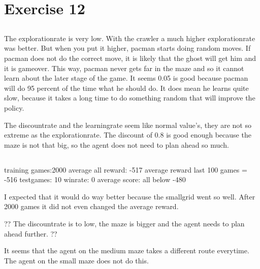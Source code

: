 \section{Exercise 12}
\subsection{}
The explorationrate is very low. With the crawler a much higher 
explorationrate was better. But when you put it higher, pacman starts 
doing random moves. If pacman does not do the correct move, it is 
likely that the ghost will get him and it is gameover. This way, pacman
never gets far in the maze and so it cannot learn about the later stage
of the game. It seems 0.05 is good because pacman will do 95 percent 
of the time what he should do. It does mean he learns quite slow, because
it takes a long time to do something random that will improve the policy.

The discountrate and the learningrate seem like normal value's, they 
are not so extreme as the explorationrate. The discount of 0.8 is good 
enough because the maze is not that big, so the agent does not need to 
plan ahead so much.

\subsection{}
training games:2000
average all reward: -517
average reward last 100 games = -516
testgames: 10
winrate: 0
average score: all below -480

I expected that it would do way better because the smallgrid went
so well. After 2000 games it did not even changed the average reward.

?? The discountrate is to low, the maze is bigger and the agent needs
to plan ahead further. ??

It seems that the agent on the medium maze takes a different route
everytime. The agent on the small maze does not do this.
